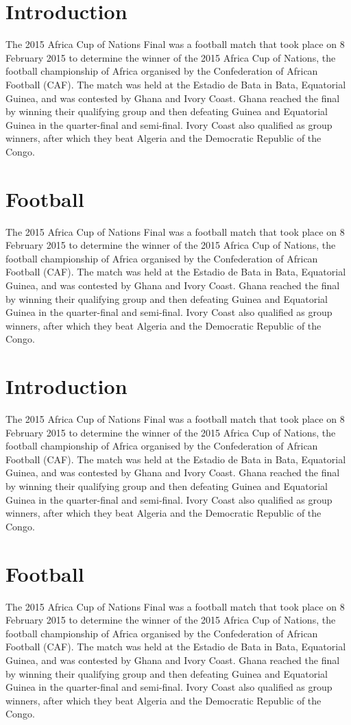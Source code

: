 \documentclass[11pt,a4]{report}
\begin{document}
\section{Introduction}
The 2015 Africa Cup of Nations Final was a football match that took place on 8 February 2015 to determine the winner of the 2015 Africa Cup of Nations, the football championship of Africa organised by the Confederation of African Football (CAF). The match was held at the Estadio de Bata in Bata, Equatorial Guinea, and was contested by Ghana and Ivory Coast. Ghana reached the final by winning their qualifying group and then defeating Guinea and Equatorial Guinea in the quarter-final and semi-final. Ivory Coast also qualified as group winners, after which they beat Algeria and the Democratic Republic of the Congo.

\section*{Football}
The 2015 Africa Cup of Nations Final was a football match that took place on 8 February 2015 to determine the winner of the 2015 Africa Cup of Nations, the football championship of Africa organised by the Confederation of African Football (CAF). The match was held at the Estadio de Bata in Bata, Equatorial Guinea, and was contested by Ghana and Ivory Coast. Ghana reached the final by winning their qualifying group and then defeating Guinea and Equatorial Guinea in the quarter-final and semi-final. Ivory Coast also qualified as group winners, after which they beat Algeria and the Democratic Republic of the Congo.
\section{Introduction}
The 2015 Africa Cup of Nations Final was a football match that took place on 8 February 2015 to determine the winner of the 2015 Africa Cup of Nations, the football championship of Africa organised by the Confederation of African Football (CAF). The match was held at the Estadio de Bata in Bata, Equatorial Guinea, and was contested by Ghana and Ivory Coast. Ghana reached the final by winning their qualifying group and then defeating Guinea and Equatorial Guinea in the quarter-final and semi-final. Ivory Coast also qualified as group winners, after which they beat Algeria and the Democratic Republic of the Congo.

\section*{Football}
The 2015 Africa Cup of Nations Final was a football match that took place on 8 February 2015 to determine the winner of the 2015 Africa Cup of Nations, the football championship of Africa organised by the Confederation of African Football (CAF). The match was held at the Estadio de Bata in Bata, Equatorial Guinea, and was contested by Ghana and Ivory Coast. Ghana reached the final by winning their qualifying group and then defeating Guinea and Equatorial Guinea in the quarter-final and semi-final. Ivory Coast also qualified as group winners, after which they beat Algeria and the Democratic Republic of the Congo.
\end{document}
